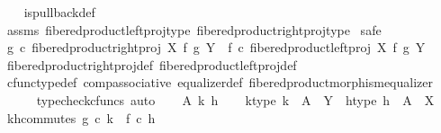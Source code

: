 \begin{isabellebody}
%
\isadelimproof
\ \ %
\endisadelimproof
%
\isatagproof
{}\isamarkupfalse%
\ is{\isacharunderscore}{\kern0pt}pullback{\isacharunderscore}{\kern0pt}def\isanewline
\ \ \isamarkupfalse%
\ assms\ fibered{\isacharunderscore}{\kern0pt}product{\isacharunderscore}{\kern0pt}left{\isacharunderscore}{\kern0pt}proj{\isacharunderscore}{\kern0pt}type\ fibered{\isacharunderscore}{\kern0pt}product{\isacharunderscore}{\kern0pt}right{\isacharunderscore}{\kern0pt}proj{\isacharunderscore}{\kern0pt}type\isanewline
{}\isamarkupfalse%
\ safe\isanewline
\ \ \isamarkupfalse%
\ {\isachardoublequoteopen}g\ {\isasymcirc}\isactrlsub c\ fibered{\isacharunderscore}{\kern0pt}product{\isacharunderscore}{\kern0pt}right{\isacharunderscore}{\kern0pt}proj\ X\ f\ g\ Y\ {\isacharequal}{\kern0pt}\ f\ {\isasymcirc}\isactrlsub c\ fibered{\isacharunderscore}{\kern0pt}product{\isacharunderscore}{\kern0pt}left{\isacharunderscore}{\kern0pt}proj\ X\ f\ g\ Y{\isachardoublequoteclose}\isanewline
\ \ \ \ \isamarkupfalse%
\ fibered{\isacharunderscore}{\kern0pt}product{\isacharunderscore}{\kern0pt}right{\isacharunderscore}{\kern0pt}proj{\isacharunderscore}{\kern0pt}def\ fibered{\isacharunderscore}{\kern0pt}product{\isacharunderscore}{\kern0pt}left{\isacharunderscore}{\kern0pt}proj{\isacharunderscore}{\kern0pt}def\isanewline
\ \ \ \ \isamarkupfalse%
\ cfunc{\isacharunderscore}{\kern0pt}type{\isacharunderscore}{\kern0pt}def\ comp{\isacharunderscore}{\kern0pt}associative{}\ equalizer{\isacharunderscore}{\kern0pt}def\ fibered{\isacharunderscore}{\kern0pt}product{\isacharunderscore}{\kern0pt}morphism{\isacharunderscore}{\kern0pt}equalizer\isanewline
\ \ \ \ \isamarkupfalse%
\ {\isacharparenleft}{\kern0pt}typecheck{\isacharunderscore}{\kern0pt}cfuncs{\isacharcomma}{\kern0pt}\ auto{\isacharparenright}{\kern0pt}\isanewline
{}\isamarkupfalse%
\isanewline
\ \ \isamarkupfalse%
\ A\ k\ h\isanewline
\ \ \isamarkupfalse%
\ k{\isacharunderscore}{\kern0pt}type{\isacharcolon}{\kern0pt}\ {\isachardoublequoteopen}k\ {\isacharcolon}{\kern0pt}\ A\ {\isasymrightarrow}\ Y{\isachardoublequoteclose}\ \ h{\isacharunderscore}{\kern0pt}type{\isacharcolon}{\kern0pt}\ {\isachardoublequoteopen}h\ {\isacharcolon}{\kern0pt}\ A\ {\isasymrightarrow}\ X{\isachardoublequoteclose}\isanewline
\ \ \isamarkupfalse%
\ k{\isacharunderscore}{\kern0pt}h{\isacharunderscore}{\kern0pt}commutes{\isacharcolon}{\kern0pt}\ {\isachardoublequoteopen}g\ {\isasymcirc}\isactrlsub c\ k\ {\isacharequal}{\kern0pt}\ f\ {\isasymcirc}\isactrlsub c\ h{\isachardoublequoteclose}\isanewline

\end{isabellebody}
